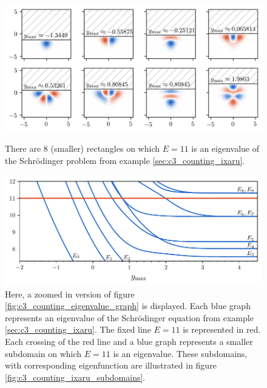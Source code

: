 \begin{figure}
  \begin{center}
    \includegraphics[width=1\textwidth]{img/chapter3/counting/ixaru.png}
  \end{center}
  \caption{There are 8 (smaller) rectangles on which $E = 11$ is an eigenvalue of the Schrödinger problem from example \ref{sec:c3_counting_ixaru}.}\label{fig:c3_counting_ixaru_subdomains}
  \vspace{1cm}
  \begin{center}
    \includegraphics[width=1\textwidth]{img/chapter3/counting/counting_eigenvalues_zoom.pdf}
  \end{center}
  \caption{Here, a zoomed in version of figure \ref{fig:c3_counting_eigenvalue_graph} is displayed. Each blue graph represents an eigenvalue of the Schrödinger equation from example \ref{sec:c3_counting_ixaru}. The fixed line $E = 11$ is represented in red. Each crossing of the red line and a blue graph represents a smaller subdomain on which $E=11$ is an eigenvalue. These subdomains, with corresponding eigenfunction are illustrated in figure \ref{fig:c3_counting_ixaru_subdomains}.}\label{fig:counting_eigenvalues_zoom}
\end{figure}

